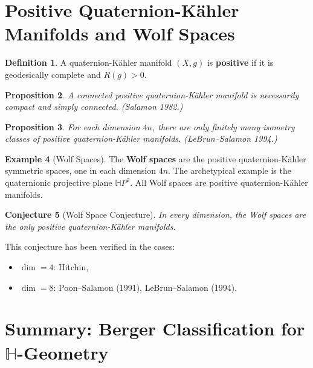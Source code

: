 \documentclass[12pt]{article}
\theoremstyle{definition}
\newtheorem{definition}{Definition}[section]
\newtheorem{example}[definition]{Example}
\theoremstyle{plain}
\newtheorem{proposition}[definition]{Proposition}
\newtheorem{conjecture}[definition]{Conjecture}
\newcommand{\HH}{\mathbb{H}}
\begin{document}
\section{Positive Quaternion-K\"{a}hler Manifolds and Wolf Spaces}

\begin{definition}
A quaternion-K\"{a}hler manifold $(X, g)$ is \textbf{positive} if it is geodesically complete and $R(g) > 0$.
\end{definition}

\begin{proposition}
A connected positive quaternion-K\"{a}hler manifold is necessarily compact and simply connected. (Salamon 1982.)
\end{proposition}

\begin{proposition}
For each dimension $4n$, there are only finitely many isometry classes of positive quaternion-K\"{a}hler manifolds. (LeBrun--Salamon 1994.)
\end{proposition}

\begin{example}[Wolf Spaces]
The \textbf{Wolf spaces} are the positive quaternion-K\"{a}hler symmetric spaces, one in each dimension $4n$. The archetypical example is the quaternionic projective plane $\HH P^2$. All Wolf spaces are positive quaternion-K\"{a}hler manifolds.
\end{example}

\begin{conjecture}[Wolf Space Conjecture]
In every dimension, the Wolf spaces are the only positive quaternion-K\"{a}hler manifolds.
\end{conjecture}

This conjecture has been verified in the cases:
\begin{itemize}
  \item $\dim = 4$: Hitchin,
  \item $\dim = 8$: Poon--Salamon (1991), LeBrun--Salamon (1994).
\end{itemize}

\section{Summary: Berger Classification for $\HH$-Geometry}
\end{document}
